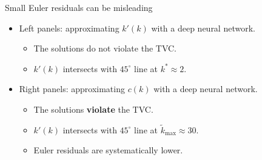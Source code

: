 \documentclass[aspectratio=169,10pt]{beamer}
\newcommand{\emphcolor}[1]{\textbf{\textcolor{emphcolorval}{#1}}}
\begin{document}
\begin{frame}{Small Euler residuals can be misleading}
	\begin{minipage}[t]{0.4\textwidth}
	\end{minipage}
	\hfill%
	\begin{minipage}[t]{0.5\textwidth}\raggedleft
		\begin{itemize}
			\item Left panels: approximating $k'(k)$ with a deep neural network.			\smallskip
			\begin{itemize}
				\item The solutions do not violate the TVC.			\smallskip
				\item $k'(k)$ intersects with $45^{\circ}$ line at $k^*\approx 2$.			\smallskip
			\end{itemize}
			\smallskip
			\item Right panels: approximating $c(k)$ with a deep neural network.
			\begin{itemize}
				\item The solutions \emphcolor{violate} the TVC.			\smallskip
				\item $k'(k)$ intersects with $45^{\circ}$ line at $\tilde{k}_{\text{max}}\approx 30$.			\smallskip
				\item Euler residuals are systematically lower. 
			\end{itemize}
			
		\end{itemize}
	\end{minipage}
\end{frame}
\end{document}
